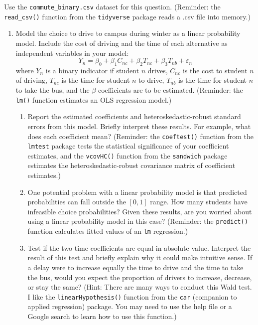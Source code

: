 \documentclass[11pt,letterpaper]{article}
\begin{document}
Use the \texttt{commute\_binary.csv} dataset for this question. (Reminder: the \texttt{read\_csv()} function from the \texttt{tidyverse} package reads a .csv file into memory.)

\begin{enumerate}[label=\alph*., leftmargin=*]
	\item Model the choice to drive to campus during winter as a linear probability model. Include the cost of driving and the time of each alternative as independent variables in your model:
	$$Y_n = \beta_0 + \beta_1 C_{nc} + \beta_2 T_{nc} + \beta_3 T_{nb} + \varepsilon_{n}$$
	where $Y_n$ is a binary indicator if student $n$ drives, $C_{nc}$ is the cost to student $n$ of driving, $T_{nc}$ is the time for student $n$ to drive, $T_{nb}$ is the time for student $n$ to take the bus, and the $\beta$ coefficients are to be estimated. (Reminder: the \texttt{lm()} function estimates an OLS regression model.)

	\begin{enumerate}[label=\roman*.]
		\item Report the estimated coefficients and heteroskedastic-robust standard errors from this model. Briefly interpret these results. For example, what does each coefficient mean? (Reminder: the \texttt{coeftest()} function from the \texttt{lmtest} package tests the statistical significance of your coefficient estimates, and the \texttt{vcovHC()} function from the \texttt{sandwich} package estimates the heteroskedastic-robust covariance matrix of coefficient estimates.)

		\item One potential problem with a linear probability model is that predicted probabilities can fall outside the $[0, 1]$ range. How many students have infeasible choice probabilities? Given these results, are you worried about using a linear probability model in this case? (Reminder: the \texttt{predict()} function calculates fitted values of an \texttt{lm} regression.)

		\item Test if the two time coefficients are equal in absolute value. Interpret the result of this test and briefly explain why it could make intuitive sense. If a delay were to increase equally the time to drive and the time to take the bus, would you expect the proportion of drivers to increase, decrease, or stay the same? (Hint: There are many ways to conduct this Wald test. I like the \texttt{linearHypothesis()} function from the \texttt{car} (companion to applied regression) package. You may need to use the help file or a Google search to learn how to use this function.) 
	\end{enumerate}
\end{enumerate}
\end{document}
